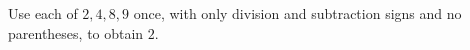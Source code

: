 Use each of $ 2,4,8,9 $ once, with only division and subtraction signs and no parentheses, to obtain $ 2 $.
